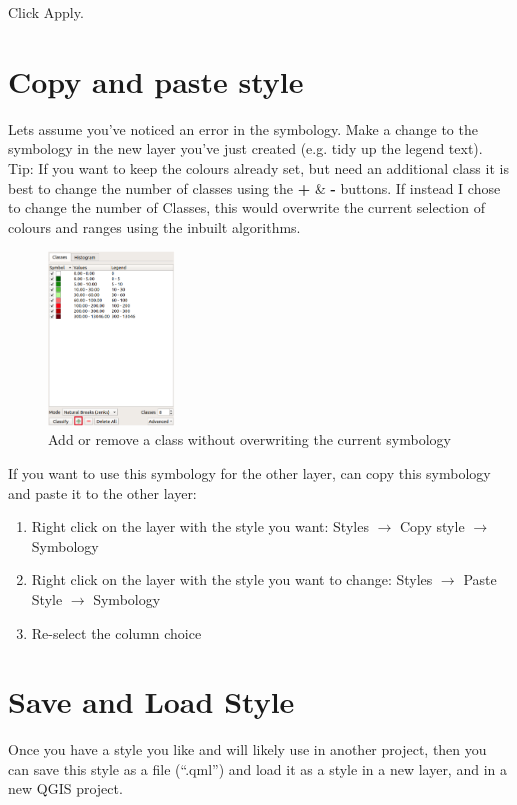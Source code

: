 Click Apply.\\

\section{Copy and paste style}

Lets assume you've noticed an error in the symbology. Make a change to the symbology in the new layer you've just created (e.g. tidy up the legend text).\\
 
Tip: If you want to keep the colours already set, but need an additional class it is best to change the number of classes using the \textbf{+} \& \textbf{-} buttons. If instead I chose to change the number of Classes, this would overwrite the current selection of colours and ranges using the inbuilt algorithms.

\begin{figure}[!h]
	\centering
	\includegraphics[width=0.3\textwidth]{images/add_class_layer_styling.png}
	\caption{Add or remove a class without overwriting the current symbology}
	\label{ft_fig_firstfig3}
\end{figure}

If you want to use this symbology for the other layer, can copy this symbology and paste it to the other layer:
\begin{enumerate}
	\item 
Right click on the layer with the style you want: Styles $\rightarrow$ Copy style  $\rightarrow$ Symbology
	\item 
Right click on the layer with the style you want to change: Styles $\rightarrow$ Paste Style $\rightarrow$ Symbology 
	\item 
Re-select the column choice
\end{enumerate}

\null\newpage
\section{Save and Load Style}
Once you have a style you like and will likely use in another project, then you can save this style as a file (“.qml”) and load it as a style in a new layer, and in a new QGIS project.\\

